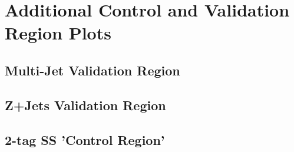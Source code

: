 \clearpage
\section{Additional Control and Validation Region Plots}%
\label{app:control_and_validation_regions}


\subsection{Multi-Jet Validation Region}

\subsection{Z+Jets Validation Region}

\subsection{2-tag SS 'Control Region'}


